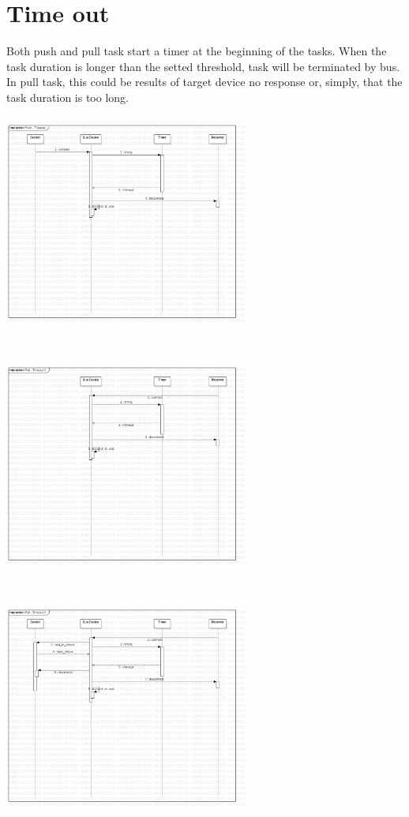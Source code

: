 \documentclass[12pt,article]{memoir}
\begin{document}
\section{Time out}
Both push and pull task start a timer at the beginning of the tasks. When the task duration is longer than the setted threshold, task will be terminated by bus.\\
In pull task, this could be results of target device no response or, simply, that the task duration is too long.\\
\includegraphics[width=8cm,height=8cm]{img/DR00012_Push_Timeout.jpg}
\includegraphics[width=8cm,height=8cm]{img/DR00012_Pull_Timeout_1.jpg}\\
\includegraphics[width=8cm,height=8cm]{img/DR00012_Pull_Timeout_2.jpg}
\end{document}
